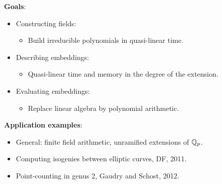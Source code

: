 \documentclass[12pt]{beamer}
\begin{document}
\begin{frame}
  
  \vspace*{3mm}
  \textbf{Goals}:
  \begin{itemize}
  \item Constructing fields:
    \begin{itemize}
    \item Build irreducible polynomials in quasi-linear time.
    \end{itemize}
  \item Describing embeddings:
    \begin{itemize}
    \item Quasi-linear time and memory in the degree of the extension.
    \end{itemize}
  \item Evaluating embeddings:
    \begin{itemize}
    \item Replace linear algebra by polynomial arithmetic.
    \end{itemize}
  \end{itemize}
  
  \vspace*{3mm}
  \textbf{Application examples}:
  \begin{itemize}
  \item General: finite field arithmetic, unramified extensions of $\mathbb{Q}_p$.
  \item Computing isogenies between elliptic curves, DF, 2011.
  \item Point-counting in genus 2, Gaudry and Schost, 2012.
  \end{itemize}
  
\end{frame}
\end{document}
